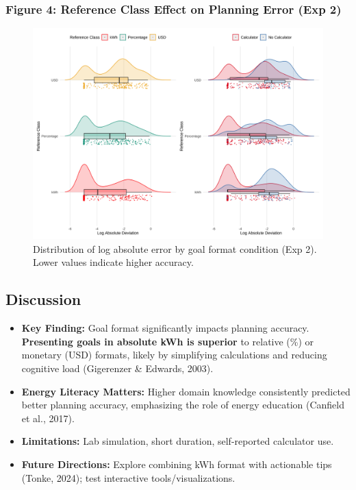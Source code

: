 \documentclass[
  12pt,
]{article}
\providecommand{\tightlist}{%
  \setlength{\itemsep}{0pt}\setlength{\parskip}{0pt}}
\begin{document}
\begin{multicols}{3}
\begin{figure}[H]
\end{figure}

\columnbreak

\subsubsection{Figure 4: Reference Class Effect on Planning Error (Exp
2)}\label{figure-4-reference-class-effect-on-planning-error-exp-2}

\begin{figure}[H]

{\centering \includegraphics[width=0.83\linewidth,height=\textheight,keepaspectratio]{assets/images/fig-s2-log-dist-1.png}

}

\caption{Distribution of log absolute error by goal format condition
(Exp 2). Lower values indicate higher accuracy.}

\end{figure}%

\subsection{Discussion}\label{discussion}

\begin{itemize}
\tightlist
\item
  \textbf{Key Finding:} Goal format significantly impacts planning
  accuracy. \textbf{Presenting goals in absolute kWh is superior} to
  relative (\%) or monetary (USD) formats, likely by simplifying
  calculations and reducing cognitive load (Gigerenzer \& Edwards,
  2003).
\item
  \textbf{Energy Literacy Matters:} Higher domain knowledge consistently
  predicted better planning accuracy, emphasizing the role of energy
  education (Canfield et al., 2017).
\item
  \textbf{Limitations:} Lab simulation, short duration, self-reported
  calculator use.
\item
  \textbf{Future Directions:} Explore combining kWh format with
  actionable tips (Tonke, 2024); test interactive tools/visualizations.
\end{itemize}


\end{multicols}
\end{document}
